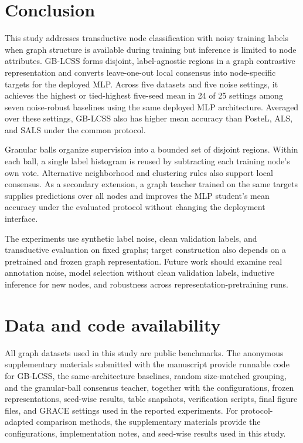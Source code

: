 \documentclass[preprint,12pt]{elsarticle}
\begin{document}
\FloatBarrier

\section{Conclusion}\label{sec:7}

This study addresses transductive node classification with noisy training labels when graph structure is available during training but inference is limited to node attributes. GB-LCSS forms disjoint, label-agnostic regions in a graph contrastive representation and converts leave-one-out local consensus into node-specific targets for the deployed MLP. Across five datasets and five noise settings, it achieves the highest or tied-highest five-seed mean in 24 of 25 settings among seven noise-robust baselines using the same deployed MLP architecture. Averaged over these settings, GB-LCSS also has higher mean accuracy than PosteL, ALS, and SALS under the common protocol.

Granular balls organize supervision into a bounded set of disjoint regions. Within each ball, a single label histogram is reused by subtracting each training node's own vote. Alternative neighborhood and clustering rules also support local consensus. As a secondary extension, a graph teacher trained on the same targets supplies predictions over all nodes and improves the MLP student's mean accuracy under the evaluated protocol without changing the deployment interface.

The experiments use synthetic label noise, clean validation labels, and transductive evaluation on fixed graphs; target construction also depends on a pretrained and frozen graph representation. Future work should examine real annotation noise, model selection without clean validation labels, inductive inference for new nodes, and robustness across representation-pretraining runs.

\FloatBarrier

\section{Data and code availability}\label{sec:8}

All graph datasets used in this study are public benchmarks. The anonymous supplementary materials submitted with the manuscript provide runnable code for GB-LCSS, the same-architecture baselines, random size-matched grouping, and the granular-ball consensus teacher, together with the configurations, frozen representations, seed-wise results, table snapshots, verification scripts, final figure files, and GRACE settings used in the reported experiments. For protocol-adapted comparison methods, the supplementary materials provide the configurations, implementation notes, and seed-wise results used in this study.
\end{document}
